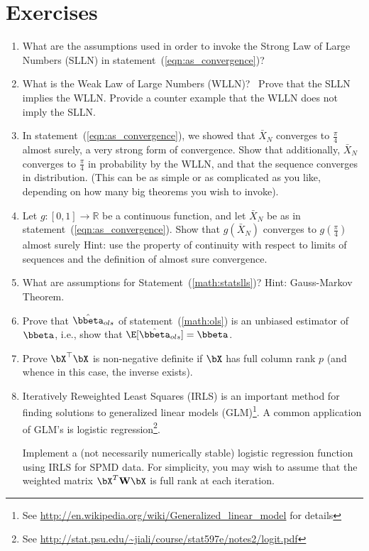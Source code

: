 \section{Exercises}
\label{sec:statistics_exercise}

\begin{enumerate}[label=\thechapter-\arabic*]
\item
What are the assumptions used in order to invoke the Strong Law of Large 
Numbers (SLLN) in statement~(\ref{eqn:as_convergence})?

\item
What is the Weak Law of Large Numbers
(WLLN)?~
Prove that the SLLN implies the WLLN. Provide a counter example that the WLLN 
does not imply the SLLN.

\item
In statement~(\ref{eqn:as_convergence}), we showed that $\bar{X}_N$ converges 
to $\frac{\pi}{4}$ almost surely,
a very strong form of convergence.  Show that 
additionally, $\bar{X}_N$ converges to $\frac{\pi}{4}$
in probability by the 
WLLN, and that the sequence converges
in distribution. (This can be as simple 
or as complicated as you like, depending on how many big theorems you wish to 
invoke).

\item
Let $g : [0, 1] \rightarrow  \mathbb{R}$ be a continuous function, and let 
$\bar{X}_N$ be as in statement~(\ref{eqn:as_convergence}).  Show that 
$g(\bar{X}_N)$ converges to $g\left(\frac{\pi}{4}\right)$ almost surely
{\color{blue} Hint: 
use the property of continuity with respect to limits of sequences and the 
definition of almost sure convergence.}

\item
What are assumptions for Statement~(\ref{math:statslls})?
{\color{blue} Hint: Gauss-Markov Theorem.}

\item
Prove that $\hat{\bbeta}_{ols}$ of statement~(\ref{math:ols}) is an unbiased
estimator of $\bbeta$, i.e., show that $\E[ \hat{\bbeta}_{ols}] = \bbeta$.
\label{ex:stat1}

\item
Prove $\bX^\top\bX$ is non-negative definite if $\bX$ has full column rank 
$p$ (and whence in this case, the inverse exists).

\item
Iteratively Reweighted Least Squares (IRLS) is an important method for finding 
solutions to generalized linear models (GLM)\footnote{See 
\url{http://en.wikipedia.org/wiki/Generalized_linear_model} for details}.  A 
common application of GLM's is logistic regression\footnote{See 
\url{http://stat.psu.edu/~jiali/course/stat597e/notes2/logit.pdf}}.

Implement a (not necessarily numerically stable) logistic regression function 
using IRLS for SPMD data.  For simplicity, you may wish to assume that the 
weighted matrix $\bX^T\textbf{W}\bX$ is full rank at each iteration.
  
\end{enumerate}

